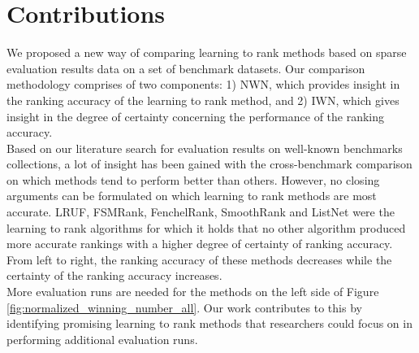 \documentclass{llncs}
\begin{document}
\section{Contributions}
We proposed a new way of comparing learning to rank methods based on sparse evaluation results data on a set of benchmark datasets. Our comparison methodology comprises of two components: 1) NWN, which provides insight in the ranking accuracy of the learning to rank method, and 2) IWN, which gives insight in the degree of certainty concerning the performance of the ranking accuracy.\\
Based on our literature search for evaluation results on well-known benchmarks collections, a lot of insight has been gained with the cross-benchmark comparison on which methods tend to perform better than others. However, no closing arguments can be formulated on which learning to rank methods are most accurate. LRUF, FSMRank, FenchelRank, SmoothRank and ListNet were the learning to rank algorithms for which it holds that no other algorithm produced more accurate rankings with a higher degree of certainty of ranking accuracy. From left to right, the ranking accuracy of these methods decreases while the certainty of the ranking accuracy increases.\\
More evaluation runs are needed for the methods on the left side of Figure \ref{fig:normalized_winning_number_all}. Our work contributes to this by identifying promising learning to rank methods that researchers could focus on in performing additional evaluation runs.



\newpage
\end{document}
